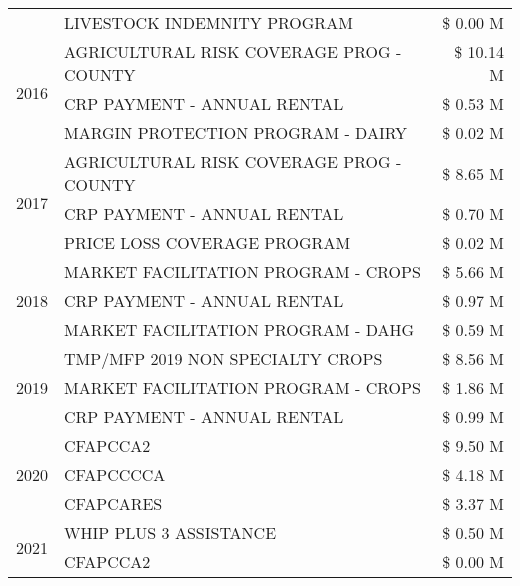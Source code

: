 \begin{tabular}{llr}
 & LIVESTOCK INDEMNITY PROGRAM & \$ 0.00 M \\
\cline{1-3}
\multirow[t]{3}{*}{2016} & AGRICULTURAL RISK COVERAGE PROG - COUNTY & \$ 10.14 M \\
 & CRP PAYMENT - ANNUAL RENTAL & \$ 0.53 M \\
 & MARGIN PROTECTION PROGRAM - DAIRY & \$ 0.02 M \\
\cline{1-3}
\multirow[t]{3}{*}{2017} & AGRICULTURAL RISK COVERAGE PROG - COUNTY & \$ 8.65 M \\
 & CRP PAYMENT - ANNUAL RENTAL & \$ 0.70 M \\
 & PRICE LOSS COVERAGE PROGRAM & \$ 0.02 M \\
\cline{1-3}
\multirow[t]{3}{*}{2018} & MARKET FACILITATION PROGRAM - CROPS & \$ 5.66 M \\
 & CRP PAYMENT - ANNUAL RENTAL & \$ 0.97 M \\
 & MARKET FACILITATION PROGRAM - DAHG & \$ 0.59 M \\
\cline{1-3}
\multirow[t]{3}{*}{2019} & TMP/MFP 2019 NON SPECIALTY CROPS & \$ 8.56 M \\
 & MARKET FACILITATION PROGRAM - CROPS & \$ 1.86 M \\
 & CRP PAYMENT - ANNUAL RENTAL & \$ 0.99 M \\
\cline{1-3}
\multirow[t]{3}{*}{2020} & CFAPCCA2 & \$ 9.50 M \\
 & CFAPCCCCA & \$ 4.18 M \\
 & CFAPCARES & \$ 3.37 M \\
\cline{1-3}
\multirow[t]{2}{*}{2021} & WHIP PLUS 3 ASSISTANCE & \$ 0.50 M \\
 & CFAPCCA2 & \$ 0.00 M \\
\cline{1-3}
\bottomrule
\end{tabular}
